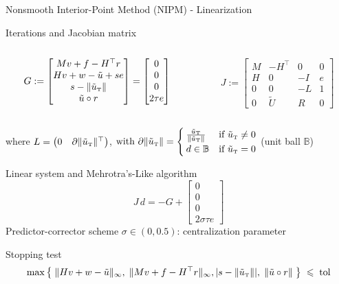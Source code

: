 \begin{frame}{Nonsmooth Interior-Point Method (NIPM) - Linearization}
  \begin{block}{{Iterations and Jacobian matrix }}
    \begin{columns}[c]
      \begin{column}{.5\textwidth}
        \begin{equation*}
          G:=\begin{bmatrix} Mv+f-H^\top r \\ Hv+w-\tilde{u}+se \\ s - \lVert\tilde{u}_{\hbox{\tiny{T}}}\rVert \\ \tilde{u} \circ r \end{bmatrix}
          = \begin{bmatrix} 0 \\ 0 \\ 0 \\ 2\tau e \end{bmatrix}
        \end{equation*}
        \quad
      \end{column}
      \begin{column}{.5\textwidth}
        \begin{equation*}
          J:=\begin{bmatrix} M & -H^\top & 0 & 0 \\ H & 0 & -I & e \\ 0 & 0 & -L & 1 \\ 0 & \tilde{U} & R & 0 \end{bmatrix}
        \end{equation*}
        \quad
      \end{column}
    \end{columns}
     where $L = \begin{pmatrix} 0 & \partial \lVert\tilde{u}_{\hbox{\tiny{T}}}\rVert^\top \end{pmatrix}$, \quad $\mbox{with } \partial \lVert\tilde{u}_{\hbox{\tiny{T}}}\rVert = \begin{cases} \frac{\tilde{u}_{\hbox{\tiny{T}}}}{\lVert\tilde{u}_{\hbox{\tiny{T}}}\rVert} & \mbox{if } \tilde{u}_{\hbox{\tiny{T}}} \neq 0 \\ d \in \mathbb B & \mbox{if } \tilde{u}_{\hbox{\tiny{T}}} = 0  \end{cases}$ (unit ball $\mathbb B$)
  \end{block}
  \begin{block}{Linear system and Mehrotra's-Like algorithm}
    $$J \, d = -G + \left[ \begin{matrix} 0 \\ 0 \\ 0 \\ 2\sigma \tau e \end{matrix}\right]$$
    Predictor-corrector scheme $\sigma \in (0,0.5)${\small: centralization parameter}
  \end{block}
   \begin{block}{Stopping test}
     $$\max\left\{ \; \|Hv+w-\tilde{u}\|_\infty, \; \|Mv+f-H^\top r\|_\infty, |s - \lVert\tilde{u}_{\hbox{\tiny{T}}}\rVert|, \; \|\tilde{u} \circ r\| \; \right\}  \; \leqslant \; \mbox{tol}$$
   \end{block}
 \end{frame}


